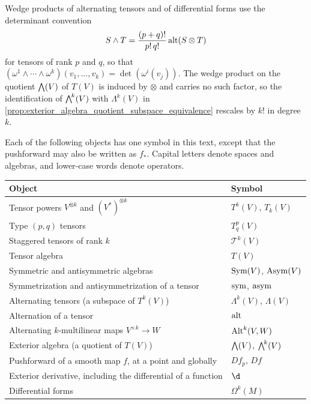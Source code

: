 \documentclass[a4paper,12pt]{article}
\begin{document}
Wedge products of alternating tensors and of differential forms use the determinant convention
\[
    S \wedge T = \frac{(p+q)!}{p!\,q!} \operatorname{alt}(S \otimes T)
\]
for tensors of rank $p$ and $q$, so that $(\omega^1 \wedge \cdots \wedge \omega^k)(v_1, \ldots, v_k) = \det(\omega^i(v_j))$.
The wedge product on the quotient $\extp(V)$ of $T(V)$ is induced by $\otimes$ and carries no such factor, so the identification of $\extp^k(V)$ with $\Lambda^k(V)$ in \cref{prop:exterior_algebra_quotient_subspace_equivalence} rescales by $k!$ in degree $k$.

Each of the following objects has one symbol in this text, except that the pushforward may also be written as $f_*$.
Capital letters denote spaces and algebras, and lower-case words denote operators.
\begin{table}[!htbp]
\begin{tabular}{@{}ll@{}}
\toprule
Object                                                            & Symbol                                \\ \midrule
Tensor powers $V^{\otimes k}$ and $(V^*)^{\otimes k}$             & $T^k(V)$, $T_k(V)$                    \\
Type $(p, q)$ tensors                                             & $T^p_q(V)$                            \\
Staggered tensors of rank $k$                                     & $\mathcal{T}^k(V)$                    \\
Tensor algebra                                                    & $T(V)$                                \\
Symmetric and antisymmetric algebras                              & $\operatorname{Sym}(V)$, $\operatorname{Asym}(V)$                 \\
Symmetrization and antisymmetrization of a tensor                 & $\operatorname{sym}$, $\operatorname{asym}$                       \\
Alternating tensors (a subspace of $T^k(V)$)                      & $\Lambda^k(V)$, $\Lambda(V)$          \\
Alternation of a tensor                                           & $\operatorname{alt}$                                \\
Alternating $k$-multilinear maps $V^{\times k} \to W$             & $\operatorname{Alt}^k(V, W)$                        \\
Exterior algebra (a quotient of $T(V)$)                           & $\extp(V)$, $\extp^k(V)$              \\
Pushforward of a smooth map $f$, at a point and globally           & $Df_p$, $Df$                          \\
Exterior derivative, including the differential of a function     & $\d$                                  \\
Differential forms                                                & $\Omega^k(M)$                         \\ \bottomrule
\end{tabular}
\end{table}
\end{document}

